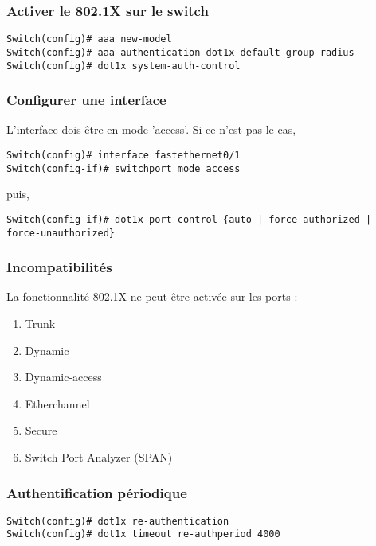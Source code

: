 \subsubsection{Activer le 802.1X sur le switch}

\begin{verbatim}
Switch(config)# aaa new-model
Switch(config)# aaa authentication dot1x default group radius
Switch(config)# dot1x system-auth-control
\end{verbatim}
\subsubsection{Configurer une interface}

L'interface dois être en mode 'access'. 
Si ce n'est pas le cas,
\begin{verbatim}
Switch(config)# interface fastethernet0/1
Switch(config-if)# switchport mode access
\end{verbatim}

puis,

\begin{verbatim}
Switch(config-if)# dot1x port-control {auto | force-authorized | force-unauthorized}
\end{verbatim}

\subsubsection{Incompatibilités}

La fonctionnalité 802.1X ne peut être activée sur les ports :
\begin{enumerate}
\item Trunk
\item Dynamic
\item Dynamic-access
\item Etherchannel
\item Secure
\item Switch Port Analyzer (SPAN)
\end{enumerate}

\subsubsection{Authentification périodique}

\begin{verbatim}
Switch(config)# dot1x re-authentication
Switch(config)# dot1x timeout re-authperiod 4000
\end{verbatim}

